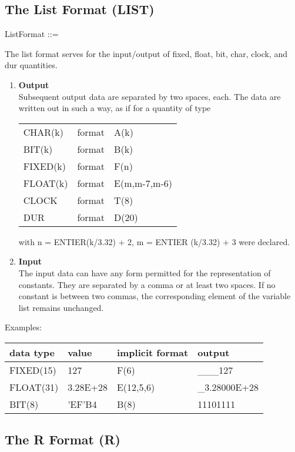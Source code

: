 \begin{removed}
\subsection{The List Format (LIST)}    %
\label{sec_dation_list_format}

ListFormat ::=\\

The list format serves for the input/output of fixed, float, bit, char,
clock, and dur quantities.
\begin{enumerate}
\item {\bf Output}\\
Subsequent output data are separated by two spaces, each. The data are
written out in such a way, as if for a quantity of type

\begin{tabular}{lll}
CHAR(k)  & format & A(k)\\
BIT(k)   & format & B(k)\\
FIXED(k) & format & F(n)\\
FLOAT(k) & format & E(m,m-7,m-6)\\
CLOCK    & format & T(8)\\
DUR      & format & D(20)
\end{tabular}

with n = ENTIER(k/3.32) + 2, m = ENTIER (k/3.32) + 3 were
declared.
\item {\bf Input}\\
The input data can have any form permitted for the representation of
constants. They are separated by a comma or at least two spaces. If no
constant is between two commas, the corresponding element of the
variable list remains unchanged.
\end{enumerate}

Examples:

\begin{tabular}{llll}
data type & value    & implicit format & output \\ \hline
FIXED(15) & 127      & F(6)            & \_\_\_127 \\
FLOAT(31) & 3.28E+28 & E(12,5,6)       & \_3.28000E+28\\
BIT(8)    & 'EF'B4   & B(8)            & 11101111
\end{tabular}
\end{removed}

\subsection{The R Format (R)}   %
\label{sec_dation_r_format}


